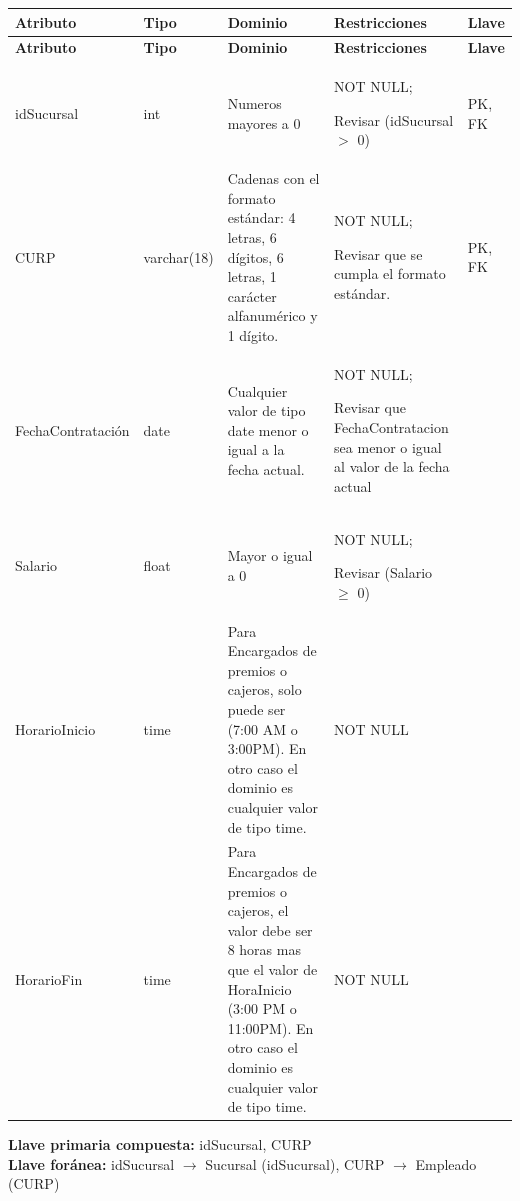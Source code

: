 \documentclass[12pt]{article}
\begin{document}
\begin{longtable}{p{3.2cm} p{2.2cm} p{4.8cm} p{4.2cm} p{1.2cm}}
\label{tab:trabajar}\\
\toprule
\textbf{Atributo} & \textbf{Tipo} & \textbf{Dominio} & \textbf{Restricciones} & \textbf{Llave} \\
\midrule
\endfirsthead

\toprule
\textbf{Atributo} & \textbf{Tipo} & \textbf{Dominio} & \textbf{Restricciones} & \textbf{Llave} \\
\midrule
\endhead

\bottomrule
\endfoot

idSucursal 
& int 
& Numeros mayores a 0
& NOT NULL;

Revisar (idSucursal $>$ 0)
& PK, FK \\

CURP 
& varchar(18) 
& Cadenas con el formato estándar: 4 letras, 6 dígitos, 6 letras, 1 carácter alfanumérico y 1 dígito.
& NOT NULL;

Revisar que se cumpla el formato estándar.
& PK, FK \\

FechaContratación 
& date 
& Cualquier valor de tipo date menor o igual a la fecha actual.
& NOT NULL;

Revisar que FechaContratacion sea menor o igual al valor de la fecha actual
& \\

Salario 
& float 
& Mayor o igual a 0 
& NOT NULL;

Revisar (Salario $\geq$ 0)
& \\

HorarioInicio 
& time
& Para Encargados de premios o cajeros, solo puede ser (7:00 AM o 3:00PM). En otro caso el dominio es cualquier valor de tipo time.
& NOT NULL
& \\

HorarioFin 
& time
& Para Encargados de premios o cajeros, el valor debe ser 8 horas mas que el valor de HoraInicio (3:00 PM o 11:00PM). En otro caso el dominio es cualquier valor de tipo time.
& NOT NULL
& \\

\end{longtable}

\vspace{2pt}
\textbf{Llave primaria compuesta:} idSucursal, CURP\\
\textbf{Llave foránea:} idSucursal $\rightarrow$ Sucursal (idSucursal), CURP $\rightarrow$ Empleado (CURP)\\
\end{document}
